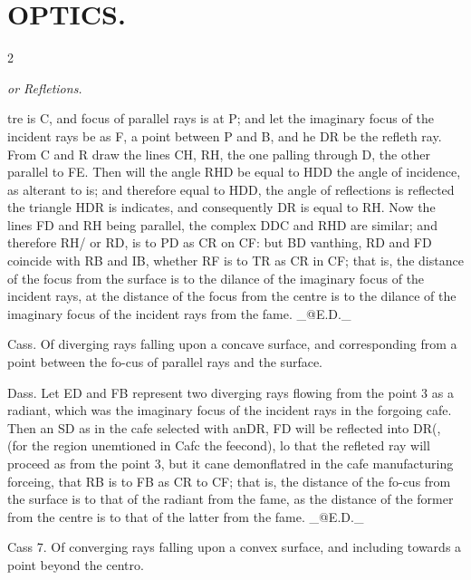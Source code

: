 \documentclass[10pt]{article}
\begin{document}
\section*{\centering \textbf{OPTICS.}}
\begin{multicols}{2}\raggedcolumns
\begin{center}\small\itshape or Refletions.\end{center}
tre is C, and focus of parallel rays is at P; and let the imaginary focus of the incident rays be as F, a point between P and B, and he DR be the refleth ray. From C and R draw the lines CH, RH, the one palling through D, the other parallel to FE. Then will the angle RHD be equal to HDD the angle of incidence, as alterant to is; and therefore equal to HDD, the angle of reflections is reflected the triangle HDR is indicates, and consequently DR is equal to RH. Now the lines FD and RH being parallel, the complex DDC and RHD are similar; and therefore RH/ or RD, is to PD as CR on CF: but BD vanthing, RD and FD coincide with RB and IB, whether RF is to TR as CR in CF; that is, the distance of the focus from the surface is to the dilance of the imaginary focus of the incident rays, at the distance of the focus from the centre is to the dilance of the imaginary focus of the incident rays from the fame. \_@E.D.\_

Cass. Of diverging rays falling upon a concave surface, and corresponding from a point between the fo-cus of parallel rays and the surface.

Dass. Let ED and FB represent two diverging rays flowing from the point 3 as a radiant, which was the imaginary focus of the incident rays in the forgoing cafe. Then an SD as in the cafe selected with anDR, FD will be reflected into DR(, (for the region unemtioned in Cafc the feecond), lo that the refleted ray will proceed as from the point 3, but it cane demonflatred in the cafe manufacturing forceing, that RB is to FB as CR to CF; that is, the distance of the fo-cus from the surface is to that of the radiant from the fame, as the distance of the former from the centre is to that of the latter from the fame. \_@E.D.\_

Cass 7. Of converging rays falling upon a convex surface, and including towards a point beyond the centro.


\end{multicols}
\end{document}

